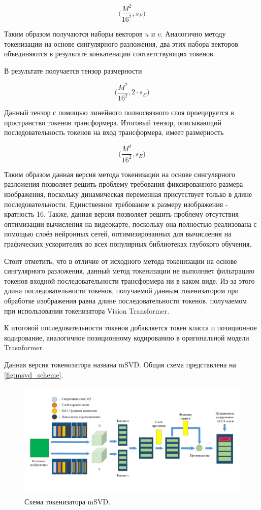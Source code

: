 $$
\Big(\dfrac{M^2}{16^2}, s_E\Big)
$$

Таким образом получаются наборы векторов $u$ и $v$. Аналогично методу токенизации на основе сингулярного разложения, два этих набора векторов объединяются в результате конкатенации соответствующих токенов. 

В результате получается тензор размерности

$$
\Big(\dfrac{M^2}{16^2}, 2 \cdot s_E\Big)
$$

Данный тензор с помощью линейного полносвязного слоя проецируется в пространство токенов трансформера. Итоговый тензор, описывающий последовательность токенов на вход трансформера, имеет размерность

$$
\Big(\dfrac{M^2}{16^2}, s_E\Big)
$$

Таким образом данная версия метода токенизации на основе сингулярного разложения позволяет решить проблему требования фиксированного размера изображения, поскольку динамическая переменная присутствует только в длине последовательности. Единственное требование к размеру изображения - кратность 16. Также, данная версия позволяет решить проблему отсутствия оптимизации вычисления на видеокарте, поскольку она полностью реализована с помощью слоёв нейронных сетей, оптимизированных для вычисления на графических ускорителях во всех популярных библиотеках глубокого обучения. 

Стоит отметить, что в отличие от исходного метода токенизации на основе сингулярного разложения, данный метод токенизации не выполняет фильтрацию токенов входной последовательности трансформера ни в каком виде. Из-за этого длина последовательности токенов, получаемой данным токенизатором при обработке изображения равна длине последовательности токенов, получаемом при использовании токенизатора Vision Transformer.

К итоговой последовательности токенов добавляется токен класса и позиционное кодирование, аналогичное позиционному кодированию в оригинальной модели Trasnformer.

Данная версия токенизатора названа mSVD. Общая схема представлена на \autoref{fig:msvd_scheme}.

\begin{figure}[H]
    \centering
    \includegraphics[width=1.0\textwidth]
    {images/research/msvd/msvd_scheme.png}
    \caption{Схема токенизатора mSVD.}
    \label{fig:msvd_scheme}
\end{figure}



